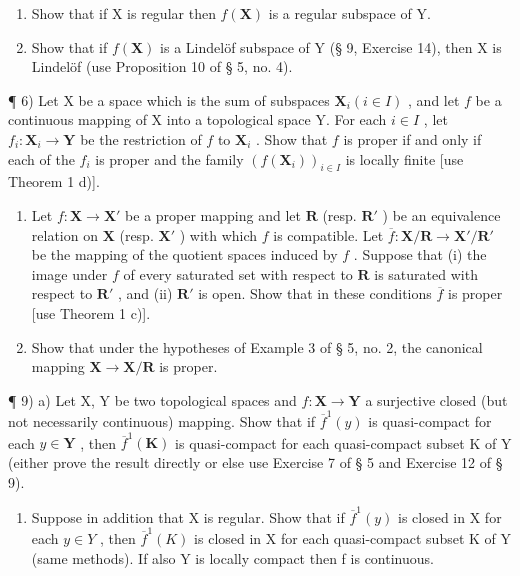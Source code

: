 \begin{enumerate}
\def\labelenumi{\alph{enumi})}
\tightlist
\item
  Show that if X is regular then \(f(\mathbf{X})\) is a regular subspace of Y.
\item
  Show that if \(f(\mathbf{X})\) is a Lindelöf subspace of Y (§ 9, Exercise 14), then X is Lindelöf (use Proposition 10 of § 5, no. 4).
\end{enumerate}

¶ 6) Let X be a space which is the sum of subspaces \(\mathbf{X}_i (i \in I)\) , and let \(f\) be a continuous mapping of X into a topological space Y. For each \(i \in I\) , let \(f_i: \mathbf{X}_i \to \mathbf{Y}\) be the restriction of \(f\) to \(\mathbf{X}_i\) . Show that \(f\) is proper if and only if each of the \(f_i\) is proper and the family \((f(\mathbf{X}_i))_{i \in I}\) is locally finite {[}use Theorem 1 d){]}.

\begin{enumerate}
\def\labelenumi{\arabic{enumi})}
\setcounter{enumi}{6}
\item
  Let \(f: \mathbf{X} \to \mathbf{X}'\) be a proper mapping and let \(\mathbf{R}\) (resp. \(\mathbf{R}'\) ) be an equivalence relation on \(\mathbf{X}\) (resp. \(\mathbf{X}'\) ) with which \(f\) is compatible. Let \(\overline{f}: \mathbf{X} / \mathbf{R} \to \mathbf{X}' / \mathbf{R}'\) be the mapping of the quotient spaces induced by \(f\) . Suppose that (i) the image under \(f\) of every saturated set with respect to \(\mathbf{R}\) is saturated with respect to \(\mathbf{R}'\) , and (ii) \(\mathbf{R}'\) is open. Show that in these conditions \(\overline{f}\) is proper {[}use Theorem 1 c){]}.
\item
  Show that under the hypotheses of Example 3 of § 5, no. 2, the canonical mapping \(\mathbf{X} \to \mathbf{X} / \mathbf{R}\) is proper.
\end{enumerate}

¶ 9) a) Let X, Y be two topological spaces and \(f: \mathbf{X} \to \mathbf{Y}\) a surjective closed (but not necessarily continuous) mapping. Show that if \(\overline{f}^{1}(y)\) is quasi-compact for each \(y \in \mathbf{Y}\) , then \(\overline{f}^{1}(\mathbf{K})\) is quasi-compact for each quasi-compact subset K of Y (either prove the result directly or else use Exercise 7 of § 5 and Exercise 12 of § 9).

\begin{enumerate}
\def\labelenumi{\alph{enumi})}
\setcounter{enumi}{1}
\tightlist
\item
  Suppose in addition that X is regular. Show that if \(\overline{f}^{1}(y)\) is closed in X for each \(y \in Y\) , then \(\overline{f}^{1}(K)\) is closed in X for each quasi-compact subset K of Y (same methods). If also Y is locally compact then f is continuous.
\end{enumerate}

